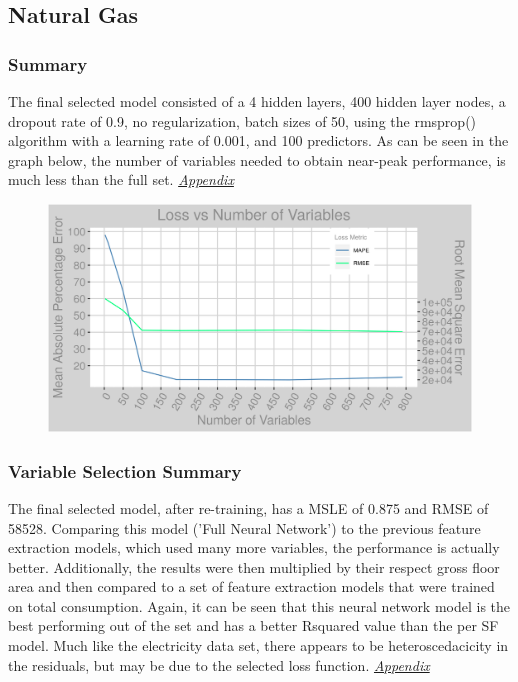 \subsection{Natural Gas}
\subsubsection{Summary}
The final selected model consisted of a 4 hidden layers, 400 hidden layer nodes, a dropout rate of 0.9, no regularization, batch sizes of 50, using the rmsprop() algorithm with a learning rate of 0.001, and 100 predictors.  As can be seen in the graph below, the number of variables needed to obtain near-peak performance, is much less than the full set. \textit{\hyperref[appendix_nn:natural_gas:nn_full]{Appendix}}

\begin{figure}[h]
\centering
\includegraphics[width=\textwidth, height=0.25\textheight]{Images/natural_gas_psf_nn_error.png}
\end{figure}

\subsubsection{Variable Selection Summary}
The final selected model, after re-training, has a MSLE of 0.875 and RMSE of 58528.  Comparing this model ('Full Neural Network') to the previous feature extraction models, which used many more variables, the performance is actually better.  Additionally, the results were then multiplied by their respect gross floor area and then compared to a set of feature extraction models that were trained on total consumption.  Again, it can be seen that this neural network model is the best performing out of the set and has a better Rsquared value than the per SF model.  Much like the electricity data set, there appears to be heteroscedacicity in the residuals, but may be due to the selected loss function.  \textit{\hyperref[appendix_nn:natural_gas:nn_full_variables]{Appendix}}

